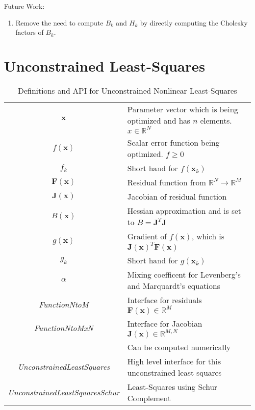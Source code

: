 \documentclass[peerreview,compsoc,onecolumn]{IEEEtran}
\newcommand{\R}{\mathbb{R}}
\newenvironment{enumargin}[1]{\begin{enumerate}[leftmargin=#1\textwidth , rightmargin=#1\textwidth]}{\end{enumerate}}
\begin{document}
Future Work:
\begin{enumargin}{0.2}
	\item Remove the need to compute $B_k$ and $H_k$ by directly computing the Cholesky factors of $B_k$. 
\end{enumargin}

\section{Unconstrained Least-Squares}
\begin{table*}[h]
\centering
\begin{tabular}{cl}
$\bm{x}$ & Parameter vector which is being optimized and has $n$ elements. $x \in \R^N$ \\
$f(\bm{x})$ & Scalar error function being optimized. $f \ge 0$ \\
$f_k$ & Short hand for $f(\bm{x}_k)$ \\
$\bm{F}(\bm{x})$ & Residual function from $\R^N \rightarrow \R^M$ \\
$\bm{J}(\bm{x})$ & Jacobian of residual function \\
$B(\bm{x})$ & Hessian approximation and is set to $B=\bm{J}^T\bm{J}$ \\
$g(\bm{x})$ & Gradient of $f(\bm{x})$, which is $\bm{J}(\bm{x})^T  \bm{F}(\bm{x})$ \\
$g_k$ & Short hand for $g(\bm{x}_k)$ \\
$\alpha$ & Mixing coefficent for Levenberg's and Marquardt's equations \\
\textit{FunctionNtoM} & Interface for residuals $\bm{F}(\bm{x}) \in \R^M$ \\
\textit{FunctionNtoMxN} & Interface for Jacobian $\bm{J}(\bm{x}) \in \R^{M,N}$ \\
& Can be computed numerically \\
\textit{UnconstrainedLeastSquares} & High level interface for this unconstrained least squares \\
\textit{UnconstrainedLeastSquaresSchur} & Least-Squares using Schur Complement
\end{tabular}
\caption{\label{definitions:UNLS}Definitions and API for Unconstrained Nonlinear Least-Squares}
\end{table*}
\end{document}
